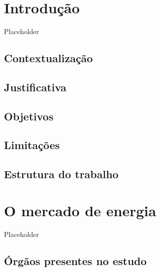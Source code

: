\documentclass[grad,numbers]{coppe}
\begin{document}
  \listoffigures

  \listoftables

  \printlosymbols
  \printloabbreviations

  \mainmatter

  \hypertarget{introduuxe7uxe3o}{%
  \chapter{Introdução}\label{introduuxe7uxe3o}}

  Placeholder

  \hypertarget{contextualizauxe7uxe3o}{%
  \section{Contextualização}\label{contextualizauxe7uxe3o}}

  \hypertarget{justificativa}{%
  \section{Justificativa}\label{justificativa}}

  \hypertarget{objetivos}{%
  \section{Objetivos}\label{objetivos}}

  \hypertarget{limitauxe7uxf5es}{%
  \section{Limitações}\label{limitauxe7uxf5es}}

  \hypertarget{estrutura-do-trabalho}{%
  \section{Estrutura do trabalho}\label{estrutura-do-trabalho}}

  \hypertarget{o-mercado-de-energia}{%
  \chapter{O mercado de energia}\label{o-mercado-de-energia}}

  Placeholder

  \hypertarget{uxf3rguxe3os-presentes-no-estudo}{%
  \section{Órgãos presentes no estudo}\label{uxf3rguxe3os-presentes-no-estudo}}
\end{document}
